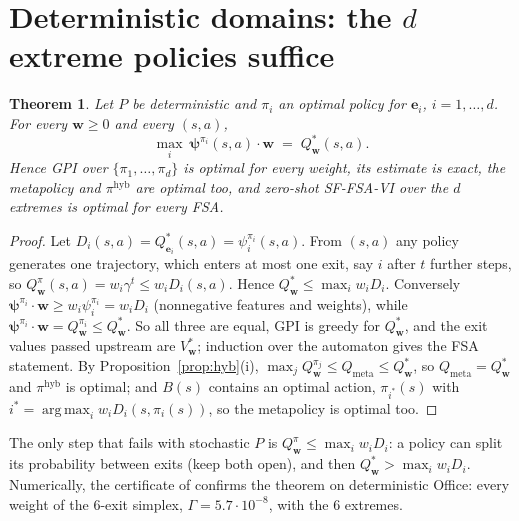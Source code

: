\documentclass[11pt]{article}
\newcommand{\vpsi}{\bm{\psi}}
\newcommand{\w}{\mathbf{w}}
\newcommand{\e}{\mathbf{e}}
\DeclareMathOperator*{\argmax}{arg\,max}
\newtheorem{theorem}{Theorem}
\begin{document}
\section{Deterministic domains: the $d$ extreme policies suffice}
\begin{theorem}\label{thm:det}
Let $P$ be deterministic and $\pi_i$ an optimal policy for $\e_i$, $i=1,\dots,d$. For every $\w\ge0$ and every $(s,a)$,
\[\max_i\ \vpsi^{\pi_i}(s,a)\cdot\w\;=\;Q^*_\w(s,a).\]
Hence GPI over $\{\pi_1,\dots,\pi_d\}$ is optimal for every weight, its estimate is exact, the metapolicy and
$\pi^{\mathrm{hyb}}$ are optimal too, and zero-shot SF-FSA-VI over the $d$ extremes is optimal for every FSA.
\end{theorem}
\begin{proof}
Let $D_i(s,a)=Q^*_{\e_i}(s,a)=\psi^{\pi_i}_i(s,a)$. From $(s,a)$ any policy generates one trajectory, which enters at
most one exit, say $i$ after $t$ further steps, so $Q^\pi_\w(s,a)=w_i\gamma^t\le w_iD_i(s,a)$. Hence
$Q^*_\w\le\max_iw_iD_i$. Conversely $\vpsi^{\pi_i}\cdot\w\ge w_i\psi^{\pi_i}_i=w_iD_i$ (nonnegative features and
weights), while $\vpsi^{\pi_i}\cdot\w=Q^{\pi_i}_\w\le Q^*_\w$. So all three are equal, GPI is greedy for $Q^*_\w$, and
the exit values passed upstream are $V^*_\w$; induction over the automaton gives the FSA statement. By Proposition~\ref{prop:hyb}(i), $\max_jQ^{\pi_j}_\w\le
Q_{\mathrm{meta}}\le Q^*_\w$, so $Q_{\mathrm{meta}}=Q^*_\w$ and $\pi^{\mathrm{hyb}}$ is optimal; and $B(s)$ contains an
optimal action, $\pi_{i^*}(s)$ with $i^*=\argmax_iw_iD_i(s,\pi_i(s))$, so the metapolicy is optimal too.
\end{proof}
\noindent The only step that fails with stochastic $P$ is $Q^\pi_\w\le\max_iw_iD_i$: a policy can split its
probability between exits (keep both open), and then $Q^*_\w>\max_iw_iD_i$. Numerically, the certificate of
\cite{note} confirms the theorem on deterministic Office: every weight of the 6-exit simplex, $\Gamma=5.7\cdot10^{-8}$,
with the 6 extremes.
\end{document}
